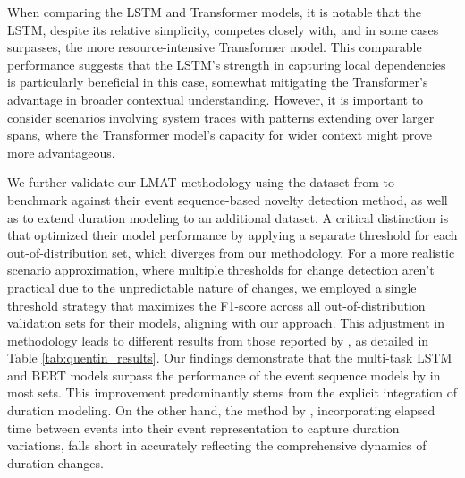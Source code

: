 \documentclass[preprint,12pt]{elsarticle}
\begin{document}
When comparing the LSTM and Transformer models, it is notable that the LSTM, despite its relative simplicity, competes closely with, and in some cases surpasses, the more resource-intensive Transformer model. This comparable performance suggests that the LSTM's strength in capturing local dependencies is particularly beneficial in this case, somewhat mitigating the Transformer's advantage in broader contextual understanding. However, it is important to consider scenarios involving system traces with patterns extending over larger spans, where the Transformer model's capacity for wider context might prove more advantageous.


We further validate our LMAT methodology using the dataset from \cite{fournier2023language} to benchmark against their event sequence-based novelty detection method, as well as to extend duration modeling to an additional dataset. A critical distinction is that \cite{fournier2023language} optimized their model performance by applying a separate threshold for each out-of-distribution set, which diverges from our methodology. For a more realistic scenario approximation, where multiple thresholds for change detection aren't practical due to the unpredictable nature of changes, we employed a single threshold strategy that maximizes the F1-score across all out-of-distribution validation sets for their models, aligning with our approach. This adjustment in methodology leads to different results from those reported by \cite{fournier2023language}, as detailed in Table \ref{tab:quentin_results}. Our findings demonstrate that the multi-task LSTM and BERT models surpass the performance of the event sequence models by \cite{fournier2023language} in most sets. This improvement predominantly stems from the  explicit integration of duration modeling. On the other hand, the method by \cite{fournier2023language}, incorporating elapsed time between events into their event representation to capture duration variations, falls short in accurately reflecting the comprehensive dynamics of duration changes.
\end{document}
